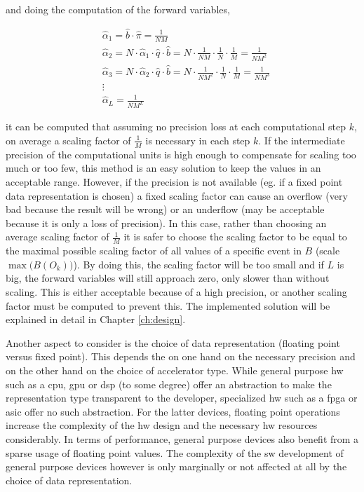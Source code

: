 \documentclass[mscthesis]{usiinfthesis}
\begin{document}
and doing the computation of the forward variables,

\begin{equation}\begin{split}
    \label{eq:scaling_estimation}
    &\hat{\alpha}_1 = \hat{b} \cdot \hat{\pi} = \frac{1}{NM} \\
    &\hat{\alpha}_2 = N \cdot \hat{\alpha}_1 \cdot \hat{q} \cdot \hat{b} =
        N \cdot \frac{1}{NM} \cdot \frac{1}{N} \cdot \frac{1}{M} =
        \frac{1}{NM^2} \\
    &\hat{\alpha}_3 = N \cdot \hat{\alpha}_2 \cdot \hat{q} \cdot \hat{b} =
        N \cdot \frac{1}{NM^2} \cdot \frac{1}{N} \cdot \frac{1}{M} =
        \frac{1}{NM^3} \\
    &\vdots\\
    & \hat{\alpha}_L = \frac{1}{NM^L}
\end{split}\end{equation}

it can be computed that assuming no precision loss at each computational step
$k$, on average a scaling factor of $\frac{1}{M}$ is necessary in each step
$k$. If the intermediate precision of the computational units is high enough to
compensate for scaling too much or too few, this method is an easy solution to
keep the values in an acceptable range. However, if the precision is not
available (eg. if a fixed point data representation is chosen) a fixed scaling
factor can cause an overflow (very bad because the result will be wrong) or an
underflow (may be acceptable because it is only a loss of precision). In this
case, rather than choosing an average scaling factor of $\frac{1}{M}$ it is
safer to choose the scaling factor to be equal to the maximal possible scaling
factor of all values of a specific event in $B$ (scale $\max\big(B(O_k)\big)$).
By doing this, the scaling factor will be too small and if $L$ is big, the
forward variables will still approach zero, only slower than without scaling.
This is either acceptable because of a high precision, or another scaling
factor must be computed to prevent this. The implemented solution will be
explained in detail in Chapter \ref{ch:design}.

Another aspect to consider is the choice of data representation (floating point
versus fixed point). This depends the on one hand on the necessary precision and on
the other hand on the choice of accelerator type. While general purpose
\gls{hw} such as a \gls{cpu}, \gls{gpu} or \gls{dsp} (to some degree) offer an
abstraction to make the representation type transparent to the developer,
specialized \gls{hw} such as a \gls{fpga} or \gls{asic} offer no such
abstraction. For the latter devices, floating point operations increase the
complexity of the \gls{hw} design and the necessary \gls{hw} resources
considerably. In terms of performance, general purpose devices also benefit
from a sparse usage of floating point values. The complexity of the \gls{sw}
development of general purpose devices however is only marginally or not
affected at all by the choice of data representation.
\end{document}
